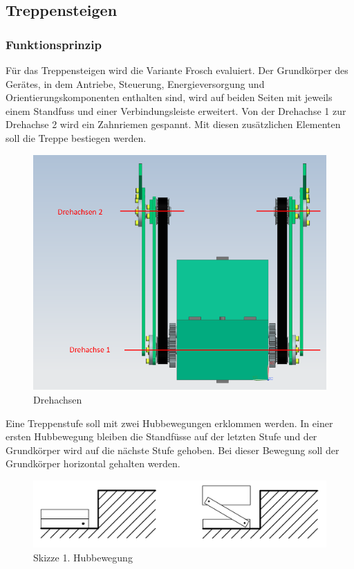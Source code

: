 \subsection{Treppensteigen}

\subsubsection{Funktionsprinzip}
Für das Treppensteigen wird die Variante \glqq Frosch \grqq{} evaluiert. Der Grundkörper des Gerätes, in dem Antriebe, Steuerung, Energieversorgung und Orientierungskomponenten enthalten sind, wird auf beiden Seiten mit jeweils einem Standfuss und einer Verbindungsleiste erweitert. Von der Drehachse 1 zur Drehachse 2 wird ein Zahnriemen gespannt. Mit diesen zusätzlichen Elementen soll die Treppe bestiegen werden.

\begin{figure}[H]
  \includegraphics[width=1\textwidth]{img/Treppensteigen/Skizze Drehachsen final.PNG}
  \centering
  \caption{Drehachsen}
\end{figure}

Eine Treppenstufe soll mit zwei Hubbewegungen erklommen werden. In einer ersten Hubbewegung bleiben die Standfüsse auf der letzten Stufe und der Grundkörper wird auf die nächste Stufe gehoben. Bei dieser Bewegung soll der Grundkörper horizontal gehalten werden.

\begin{figure}[H]
  \includegraphics[width=1\textwidth]{img/Treppensteigen/1. Hubbewegung Skizze.png}
  \centering
  \caption{Skizze 1. Hubbewegung}
\end{figure}
 
